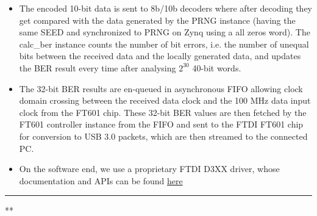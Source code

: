 \documentclass[11pt,oneside,fleqn]{book} %
\begin{document}
\begin{itemize}
    \item The encoded 10-bit data is sent to 8b/10b decoders where after decoding they get compared with the data generated by the PRNG instance (having the same SEED and synchronized to PRNG on Zynq using a all zeros word). The calc\_ber instance counts the number of bit errors, i.e. the number of unequal bits between the received data and the locally generated data, and updates the BER result every time after analysing $2^{30}$ 40-bit words.
    \item The 32-bit BER results are en-queued in asynchronous FIFO allowing clock domain crossing between the received data clock and the 100 MHz data input clock from the FT601 chip.
    These 32-bit BER values are then fetched by the FT601 controller instance from the FIFO and sent to the FTDI FT601 chip for conversion to USB 3.0 packets, which are then streamed to the connected PC.
    \item On the software end, we use a proprietary FTDI D3XX driver, whose documentation and APIs can be found \textcolor{blue}{\href{https://github.com/apurvanandan1997/usb_plug_mod_ber/blob/master/D3XX/README.pdf}{here}} 
\end{itemize} 
\par\noindent\rule{\textwidth}{0.4pt}
\centering ***



\end{document}
